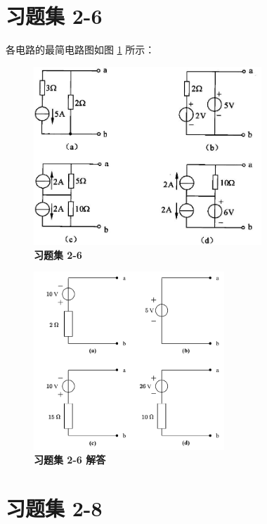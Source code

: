 \documentclass[UTF8]{report}
\theoremstyle{MyLineTheoremStyle} %
\theoremstyle{MyBlockTheoremStyle} %
\theoremstyle{MySubsubsectionStyle} %
\begin{document}
\section{习题集 2-6}

各电路的最简电路图如图 \ref{习题集 2-6 解答} 所示： 

\noindent\begin{minipage}{0.50\textwidth}
    \begin{figure}[H]\centering
        \includegraphics[height=190pt]{assets/2/bfc7d58924b9eaf9582656c984bd2c3b.jpg}
        \caption{\textbf{习题集 2-6}}
    \end{figure}
\end{minipage}\hfill
\begin{minipage}{0.50\textwidth}
    \begin{figure}[H]\centering
        \includegraphics[height=190pt]{assets/2/2-6.drawio.pdf}
        \caption{\textbf{习题集 2-6 解答}}\label{习题集 2-6 解答}
    \end{figure}        
\end{minipage}


\section{习题集 2-8}
\end{document}
